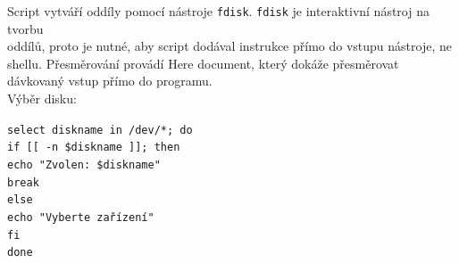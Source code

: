 \documentclass[12pt,a4paper,twoside,]{article}
\begin{document}
{Script vytváří oddíly pomocí nástroje \texttt{fdisk}. \texttt{fdisk} je interaktivní nástroj na tvorbu \\oddílů, proto je nutné, aby script dodával instrukce přímo do vstupu nástroje, ne shellu. Přesměrování provádí Here document, který dokáže přesměrovat dávkovaný vstup přímo do programu.\\ Výběr disku:}

\texttt{select diskname in /dev/*; do\\}
\texttt{if [[ -n \$diskname ]]; then\\}
\texttt{\hspace*{2em}echo "Zvolen: \$diskname"\\}
\texttt{\hspace*{2em}break\\}
\texttt{else\\}
\texttt{\hspace*{2em}echo "Vyberte zařízení"\\}
\texttt{fi\\}
\texttt{done\\}
\end{document}
